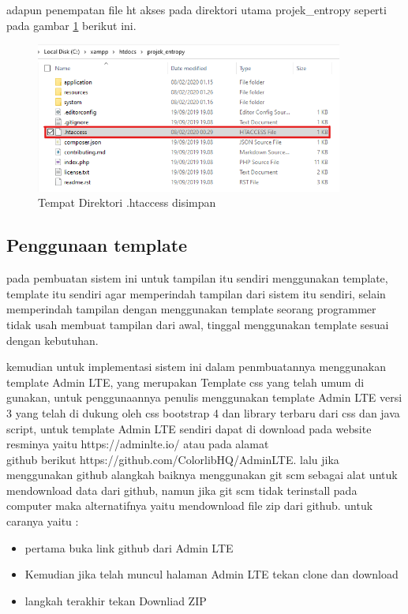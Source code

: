 adapun penempatan file ht akses pada direktori utama projek\_entropy seperti pada gambar \ref{crs5} berikut ini.

\begin{figure}[!htbp]
	\centerline{\includegraphics[width=0.90\textwidth]{figures/crs/5.png}}
	\caption{Tempat Direktori .htaccess disimpan}
	\label{crs5}
\end{figure}

\pagebreak
\subsection{Penggunaan template}

pada pembuatan sistem ini untuk tampilan itu sendiri menggunakan template, template itu sendiri agar memperindah tampilan dari sistem itu sendiri, selain memperindah tampilan dengan menggunakan template seorang programmer tidak usah membuat tampilan dari awal, tinggal menggunakan template sesuai dengan kebutuhan.\par
	kemudian untuk implementasi sistem ini dalam penmbuatannya menggunakan template Admin LTE, yang merupakan Template css yang telah umum di gunakan, untuk penggunaannya penulis menggunakan template Admin LTE versi 3 yang telah di dukung oleh css bootstrap 4 dan library terbaru dari css dan java script, untuk template Admin LTE sendiri dapat di download pada website resminya yaitu https://adminlte.io/ atau pada alamat\\ github berikut https://github.com/ColorlibHQ/AdminLTE.
	lalu jika menggunakan github alangkah baiknya menggunakan git scm sebagai alat untuk mendownload data dari github, namun jika git scm tidak terinstall pada computer maka alternatifnya yaitu mendownload file zip dari github.
untuk caranya yaitu :
\begin{itemize}
\item pertama buka link github dari Admin LTE 
\item Kemudian jika telah muncul halaman Admin LTE tekan clone dan download 
\item langkah terakhir tekan Downliad ZIP 
\end{itemize}


